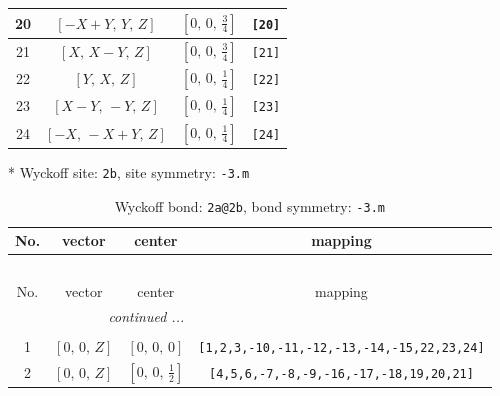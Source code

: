 \documentclass[fleqn,8pt]{jsarticle}
\begin{document}
\begin{longtable}{cccc}
20 & $\left[ - X + Y,\, Y,\, Z \right]$ & $\left[ 0,\, 0,\, \frac{3}{4} \right]$ & {\tt [20]} \\ \hline
21 & $\left[ X,\, X - Y,\, Z \right]$ & $\left[ 0,\, 0,\, \frac{3}{4} \right]$ & {\tt [21]} \\ \hline
22 & $\left[ Y,\, X,\, Z \right]$ & $\left[ 0,\, 0,\, \frac{1}{4} \right]$ & {\tt [22]} \\ \hline
23 & $\left[ X - Y,\, - Y,\, Z \right]$ & $\left[ 0,\, 0,\, \frac{1}{4} \right]$ & {\tt [23]} \\ \hline
24 & $\left[ - X,\, - X + Y,\, Z \right]$ & $\left[ 0,\, 0,\, \frac{1}{4} \right]$ & {\tt [24]} \\
\end{longtable}
* Wyckoff site: {\tt 2b}, site symmetry: {\tt -3.m}
\renewcommand{\arraystretch}{1.2}
\begin{longtable}{cccc}
\caption{Wyckoff bond: {\tt 2a@2b}, bond symmetry: {\tt -3.m}}
 \\
 \hline \hline
No. & vector & center & mapping \\ \hline \endfirsthead

\multicolumn{3}{l}{\tablename\ \thetable{}} \\
 \hline \hline
No. & vector & center & mapping \\ \hline \endhead

 \hline \hline
\multicolumn{3}{r}{\footnotesize\it continued ...} \\ \endfoot

 \hline \hline
\multicolumn{3}{r}{} \\ \endlastfoot

1 & $\left[ 0,\, 0,\, Z \right]$ & $\left[ 0,\, 0,\, 0 \right]$ & {\tt [1,2,3,-10,-11,-12,-13,-14,-15,22,23,24]} \\ \hline
2 & $\left[ 0,\, 0,\, Z \right]$ & $\left[ 0,\, 0,\, \frac{1}{2} \right]$ & {\tt [4,5,6,-7,-8,-9,-16,-17,-18,19,20,21]} \\
\end{longtable}
\renewcommand{\arraystretch}{1.2}
\end{document}
